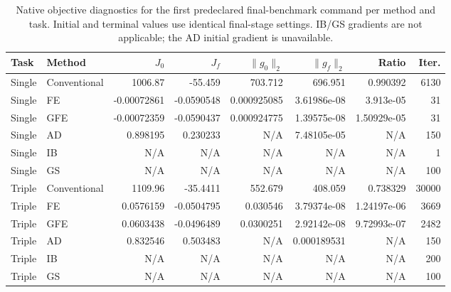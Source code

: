 \begin{table}[htbp]\centering\scriptsize
\caption{Native objective diagnostics for the first predeclared final-benchmark command per method and task. Initial and terminal values use identical final-stage settings. IB/GS gradients are not applicable; the AD initial gradient is unavailable.}
\label{tab:selected_gradients}
\begin{tabular}{llrrrrrr}\toprule
Task & Method & $J_0$ & $J_f$ & $\|g_0\|_2$ & $\|g_f\|_2$ & Ratio & Iter.\\\midrule
Single & Conventional & 1006.87 & -55.459 & 703.712 & 696.951 & 0.990392 & 6130\\
Single & FE & -0.00072861 & -0.0590548 & 0.000925085 & 3.61986e-08 & 3.913e-05 & 31\\
Single & GFE & -0.00072359 & -0.0590437 & 0.000924775 & 1.39575e-08 & 1.50929e-05 & 31\\
Single & AD & 0.898195 & 0.230233 & N/A & 7.48105e-05 & N/A & 150\\
Single & IB & N/A & N/A & N/A & N/A & N/A & 1\\
Single & GS & N/A & N/A & N/A & N/A & N/A & 100\\
Triple & Conventional & 1109.96 & -35.4411 & 552.679 & 408.059 & 0.738329 & 30000\\
Triple & FE & 0.0576159 & -0.0504795 & 0.030546 & 3.79374e-08 & 1.24197e-06 & 3669\\
Triple & GFE & 0.0603438 & -0.0496489 & 0.0300251 & 2.92142e-08 & 9.72993e-07 & 2482\\
Triple & AD & 0.832546 & 0.503483 & N/A & 0.000189531 & N/A & 150\\
Triple & IB & N/A & N/A & N/A & N/A & N/A & 200\\
Triple & GS & N/A & N/A & N/A & N/A & N/A & 100\\
\bottomrule\end{tabular}\end{table}
